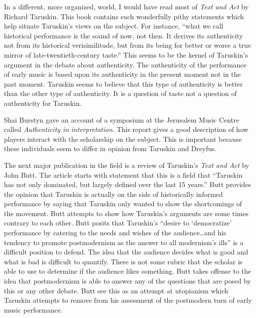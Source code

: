 \documentclass[12pt]{article}
\begin{document}
In a different, more organized, world, I would have read most of
\emph{Text and Act} by Richard Taruskin. This book contains such
wonderfully pithy statements which help situate Taruskin's views on
the subject. For instance, ``what we call historical performance is
the sound of now, not then. It derives its authenticity not from its
historical verisimilitude, but from its being for better or worse a
true mirror of late-twentieth-century
taste.''\autocite[166]{taruskin1995} This seems to be the kernel of
Taruskin's argument in the debate about authenticity. The authenticity
of the performance of early music is based upon its authenticity in
the present moment not in the past moment. Taruskin seems to believe
that this type of authenticity is better than the other type of
authenticity. It is a question of taste not a question of
authenticity for Taruskin.

Shai Burstyn gave an account of a symposium at the Jerusalem Music
Centre called \emph{Authenticity in
  interpretation}.\autocite{burstyn1995} This report gives a good
description of how players interact with the scholarship on the
subject. This is important because these individuals seem to differ in
opinion from Taruskin and Dreyfus.

The next major publication in the field is a review of Taruskin's
\emph{Text and Act} by John Butt.\autocite{butt1996} The article
starts with statement that this is a field that ``Taruskin has not
only dominated, but largely defined over the last 15
years.''\autocite[323]{butt1996} Butt provides the opinion that
Taruskin is actually on the side of historically informed performance
by saying that Taruskin only wanted to show the shortcomings of the
movement.\autocite[325]{butt1996} Butt attempts to show how Taruskin's
arguments are some times contrary to each other. Butt posits that
Taruskin's ``desire to `democratize' performance by catering to the
needs and wishes of the audience\ldots and his tendency to promote
postmodernism as the answer to all modernism's ills'' is a difficult
position to defend. The idea that the audience decides what is good
and what is bad is difficult to quantify. There is not some rubric
that the scholar is able to use to determine if the audience likes
something. Butt takes offense to the idea that postmodernism is able
to answer any of the questions that are posed by this or any other
debate. Butt see this as an attempt at utopianism which Taruskin
attempts to remove from his assessment of the postmodern turn of early
music performance.
\end{document}
